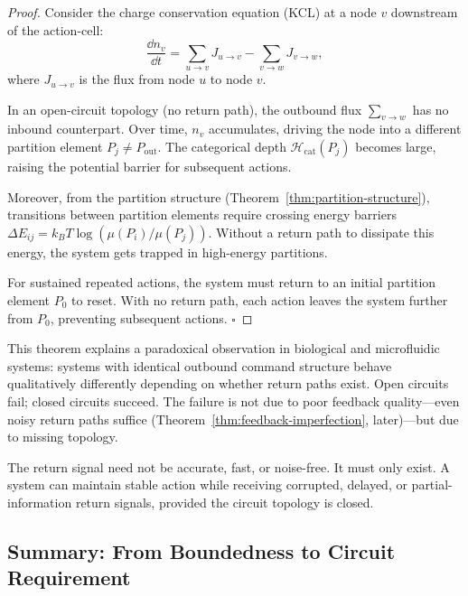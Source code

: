 \begin{proof}
Consider the charge conservation equation (KCL) at a node $v$ downstream of the action-cell:
\begin{equation}
  \frac{\dd n_v}{\dd t} = \sum_{u \to v} J_{u \to v} - \sum_{v \to w} J_{v \to w},
\end{equation}
where $J_{u \to v}$ is the flux from node $u$ to node $v$.

In an open-circuit topology (no return path), the outbound flux $\sum_{v \to w}$ has no inbound counterpart. Over time, $n_v$ accumulates, driving the node into a different partition element $P_j \ne P_{\text{out}}$. The categorical depth $\mathcal{H}_{\text{cat}}(P_j)$ becomes large, raising the potential barrier for subsequent actions.

Moreover, from the partition structure (Theorem~\ref{thm:partition-structure}), transitions between partition elements require crossing energy barriers $\Delta E_{ij} = k_B T \log(\mu(P_i)/\mu(P_j))$. Without a return path to dissipate this energy, the system gets trapped in high-energy partitions.

For sustained repeated actions, the system must return to an initial partition element $P_0$ to reset. With no return path, each action leaves the system further from $P_0$, preventing subsequent actions. $\square$
\end{proof}

\begin{remark}
This theorem explains a paradoxical observation in biological and microfluidic systems: systems with identical outbound command structure behave qualitatively differently depending on whether return paths exist. Open circuits fail; closed circuits succeed. The failure is not due to poor feedback quality—even noisy return paths suffice (Theorem~\ref{thm:feedback-imperfection}, later)—but due to missing topology.
\end{remark}

\begin{corollary}
\label{cor:fidelity-irrelevant}
The return signal need not be accurate, fast, or noise-free. It must only exist. A system can maintain stable action while receiving corrupted, delayed, or partial-information return signals, provided the circuit topology is closed.
\end{corollary}

\subsection{Summary: From Boundedness to Circuit Requirement}
\label{subsec:partition-summary}

